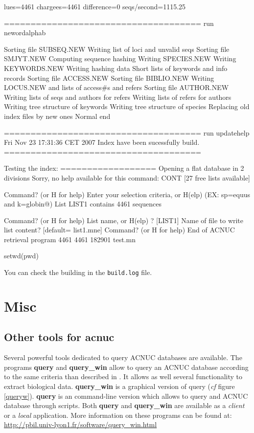 \documentclass{article}
\begin{document}
\begin{itemize}
\begin{Schunk}
\begin{Soutput}
lues=4461  chargees=4461  difference=0 seqs/second=1115.25

=====================================
run newordalphab

Sorting file SUBSEQ.NEW
Writing list of loci and unvalid seqs
Sorting file SMJYT.NEW
Computing sequence hashing
Writing SPECIES.NEW
Writing KEYWORDS.NEW
Writing hashing data
Short lists of keywords and info records
Sorting file ACCESS.NEW
Sorting file BIBLIO.NEW
Writing LOCUS.NEW and lists of access#s and refers
Sorting file AUTHOR.NEW
Writing lists of seqs and authors for refers
Writing lists of refers for authors
Writing tree structure of keywords
Writing tree structure of species
Replacing old index files by new ones
Normal end

=====================================
run updatehelp
Fri Nov 23 17:31:36 CET 2007
Index have been sucessfully build.
=====================================
 
Testing the index:
==================
Opening a flat database in 2 divisions
Sorry, no help available for this command: CONT
[27 free lists available]

Command? (or H for help)
Enter your selection criteria, or H(elp) (EX: sp=equus and k=globin@)
List LIST1 contains 4461 sequences 

Command? (or H for help)
List name,  or H(elp) ?  [LIST1] Name of file to write list content? [default= list1.mne] 
Command? (or H for help)
End of ACNUC retrieval program
    4461    4461  182901 test.mn
\end{Soutput}
\begin{Sinput}
 setwd(pwd)
\end{Sinput}
\end{Schunk}
You can check the building in the \texttt{build.log} file.

\end{itemize}




\section{Misc} 

\subsection{Other tools for acnuc}

Several powerful tools dedicated to query ACNUC databases are available. 
The programs \textbf{query} and \textbf{query\_win} allow to query an ACNUC database according to the same
criteria than described  in \seqinr{}. It allows as well several functionality to extract biological data.
\textbf{query\_win} is a graphical version of query (\textit{cf} figure \ref{queryw}).
\textbf{query} is an command-line version which allows to query and ACNUC database through scripts.
Both \textbf{query} and  \textbf{query\_win} are available as a
\textit{client} or a \textit{local} application. More information on these programs can be found at:
\url{http://pbil.univ-lyon1.fr/software/query_win.html}
\end{document}
